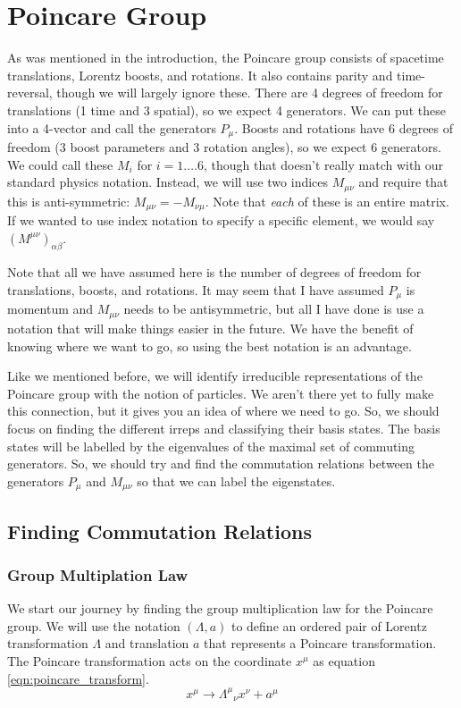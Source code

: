 \documentclass[12pt]{article}
\begin{document}
\section{Poincare Group}
As was mentioned in the introduction, the Poincare group consists of spacetime translations, Lorentz boosts, and rotations. It also contains parity and time-reversal, though we will largely ignore these. There are 4 degrees of freedom for translations (1 time and 3 spatial), so we expect 4 generators. We can put these into a 4-vector and call the generators $P_\mu$. Boosts and rotations have 6 degrees of freedom (3 boost parameters and 3 rotation angles), so we expect 6 generators. We could call these $M_i$ for $i=1.\dots6$, though that doesn't really match with our standard physics notation. Instead, we will use two indices $M_{\mu\nu}$ and require that this is anti-symmetric: $M_{\mu\nu}=-M_{\nu\mu}$. Note that \textit{each} of these is an entire matrix. If we wanted to use index notation to specify a specific element, we would say $(M^{\mu\nu})_{\alpha\beta}$.

Note that all we have assumed here is the number of degrees of freedom for translations, boosts, and rotations. It may seem that I have assumed $P_\mu$ is momentum and $M_{\mu\nu}$ needs to be antisymmetric, but all I have done is use a notation that will make things easier in the future. We have the benefit of knowing where we want to go, so using the best notation is an advantage.

Like we mentioned before, we will identify irreducible representations of the Poincare group with the notion of particles. We aren't there yet to fully make this connection, but it gives you an idea of where we need to go. So, we should focus on finding the different irreps and classifying their basis states. The basis states will be labelled by the eigenvalues of the maximal set of commuting generators. So, we should try and find the commutation relations between the generators $P_{\mu}$ and $M_{\mu\nu}$ so that we can label the eigenstates.

\subsection{Finding Commutation Relations}
\subsubsection{Group Multiplation Law}
We start our journey by finding the group multiplication law for the Poincare group. We will use the notation $(\Lambda,a)$ to define an ordered pair of Lorentz transformation $\Lambda$ and translation $a$ that represents a Poincare transformation. The Poincare transformation acts on the coordinate $x^\mu$ as equation \ref{eqn:poincare_transform}.
\begin{equation}
    x^\mu \rightarrow {\Lambda^\mu}_\nu x^\nu + a^\mu
    \label{eqn:poincare_transform}
\end{equation}
\end{document}
